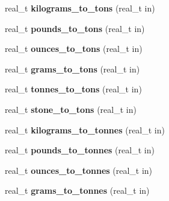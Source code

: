\begin{DoxyCompactItemize}
\item 
\hypertarget{namespaceetk_aa6fe917b99c6d514f47af27142327dcb}{real\-\_\-t {\bfseries kilograms\-\_\-to\-\_\-tons} (real\-\_\-t in)}\label{namespaceetk_aa6fe917b99c6d514f47af27142327dcb}

\item 
\hypertarget{namespaceetk_a1feb38e7861a1c03cc7aa8de7a663e5a}{real\-\_\-t {\bfseries pounds\-\_\-to\-\_\-tons} (real\-\_\-t in)}\label{namespaceetk_a1feb38e7861a1c03cc7aa8de7a663e5a}

\item 
\hypertarget{namespaceetk_abc0ac02aecb11e3977769a87fed54f43}{real\-\_\-t {\bfseries ounces\-\_\-to\-\_\-tons} (real\-\_\-t in)}\label{namespaceetk_abc0ac02aecb11e3977769a87fed54f43}

\item 
\hypertarget{namespaceetk_ae535b41bc6ea134875dd63b2e47cc7cf}{real\-\_\-t {\bfseries grams\-\_\-to\-\_\-tons} (real\-\_\-t in)}\label{namespaceetk_ae535b41bc6ea134875dd63b2e47cc7cf}

\item 
\hypertarget{namespaceetk_a60dae3de4d838a20397569d76ea14f4e}{real\-\_\-t {\bfseries tonnes\-\_\-to\-\_\-tons} (real\-\_\-t in)}\label{namespaceetk_a60dae3de4d838a20397569d76ea14f4e}

\item 
\hypertarget{namespaceetk_a9f0b5eca6b61a83948d20bbc82ffc6ed}{real\-\_\-t {\bfseries stone\-\_\-to\-\_\-tons} (real\-\_\-t in)}\label{namespaceetk_a9f0b5eca6b61a83948d20bbc82ffc6ed}

\item 
\hypertarget{namespaceetk_a7587c2fa9b116206c6e92bc996b68e4e}{real\-\_\-t {\bfseries kilograms\-\_\-to\-\_\-tonnes} (real\-\_\-t in)}\label{namespaceetk_a7587c2fa9b116206c6e92bc996b68e4e}

\item 
\hypertarget{namespaceetk_aa188511c025ea71f147f00cf12ca76a2}{real\-\_\-t {\bfseries pounds\-\_\-to\-\_\-tonnes} (real\-\_\-t in)}\label{namespaceetk_aa188511c025ea71f147f00cf12ca76a2}

\item 
\hypertarget{namespaceetk_a2e7424ed312f03cf004c0592a056cd3e}{real\-\_\-t {\bfseries ounces\-\_\-to\-\_\-tonnes} (real\-\_\-t in)}\label{namespaceetk_a2e7424ed312f03cf004c0592a056cd3e}

\item 
\hypertarget{namespaceetk_ad68d4e497ec3d576ca4e7259a276dd55}{real\-\_\-t {\bfseries grams\-\_\-to\-\_\-tonnes} (real\-\_\-t in)}\label{namespaceetk_ad68d4e497ec3d576ca4e7259a276dd55}


\end{DoxyCompactItemize}
